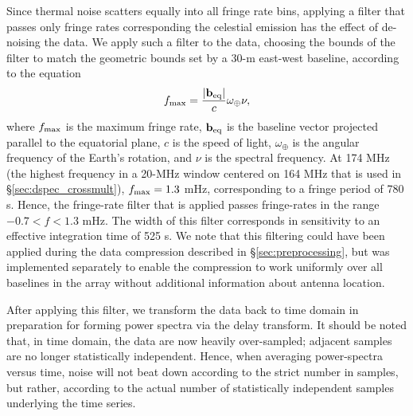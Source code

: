 \documentclass[twocolumn,apj,numberedappendix]{emulateapj}
\def\b{\mathbf{b}}
\def\b{\mathbf{b}}
\begin{document}
Since thermal noise scatters equally into all fringe rate bins, applying a filter
that passes only fringe rates corresponding the celestial emission has the effect of de-noising the data.
We apply such a filter to the data, choosing the bounds of the filter to match the geometric
bounds set by a 30-m east-west baseline, according to the equation
\begin{equation}
f_{\rm max} = \frac{|\b_{\rm eq}|}{c} \omega_\oplus \nu,
\label{eq:fringe_rate}
\end{equation}
where $f_{\rm max}$ is the maximum fringe rate, 
$\b_{\rm eq}$ is the baseline vector projected parallel to the equatorial 
plane, $c$ is the speed of light,
$\omega_\oplus$ is the angular frequency of the Earth's rotation,
and $\nu$ is the spectral frequency. 
At 174 MHz (the highest frequency in a 20-MHz window centered on 164 MHz that is used in \S\ref{sec:dspec_crossmult}),
$f_{\rm max}=1.3$ mHz, corresponding to a fringe period of 780 s.  Hence, the fringe-rate filter that is
applied passes fringe-rates in the range $-0.7<f<1.3$ mHz.  The width of this filter corresponds in 
sensitivity to an effective integration time of 525 s.
We note that
this filtering could have been applied during the data compression described in \S\ref{sec:preprocessing},
but was implemented separately to enable the compression to work uniformly
over all baselines in the array without additional information about antenna location.

After applying this filter,
we transform the data back to time domain in preparation for forming power spectra via the delay transform.
It should be noted that, in time domain, the data are now heavily over-sampled; adjacent samples are no longer
statistically independent.  Hence, when averaging power-spectra versus time,
noise will not beat down according to the strict number in samples, but rather, according to
the actual number of statistically independent samples underlying the time series.
\end{document}
